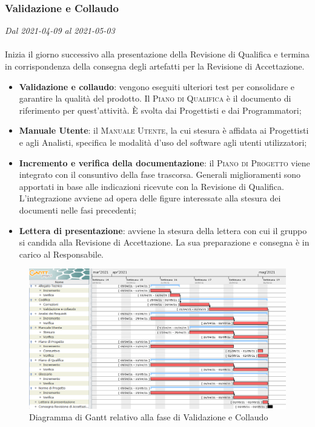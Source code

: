 \subsubsection{Validazione e Collaudo}

\textit{Dal 2021-04-09 al 2021-05-03}
\\\\
Inizia il giorno successivo alla presentazione della Revisione di Qualifica e termina in corrispondenza della consegna degli artefatti per la Revisione di Accettazione.
\begin{itemize}
	\item \textbf{Validazione e collaudo}: vengono eseguiti ulteriori test per consolidare e garantire la qualità del prodotto. Il \textsc{Piano di Qualifica} è il documento di riferimento per quest'attività. \`E svolta dai Progettisti e dai Programmatori;
	\item \textbf{Manuale Utente}: il \textsc{Manuale Utente}, la cui stesura è affidata ai Progettisti e agli Analisti, specifica le modalità d'uso del software agli utenti utilizzatori;
	\item \textbf{Incremento e verifica della documentazione}: il \textsc{Piano di Progetto} viene integrato con il consuntivo della fase trascorsa. Generali miglioramenti sono apportati in base alle indicazioni ricevute con la Revisione di Qualifica. L'integrazione avviene ad opera delle figure interessate alla stesura dei documenti nelle fasi precedenti;
	\item \textbf{Lettera di presentazione}: avviene la stesura della lettera con cui il gruppo si candida alla Revisione di Accettazione. La sua preparazione e consegna è in carico al Responsabile.
\end{itemize}

\begin{figure}[H]
	\centering
	\includegraphics[scale=0.51]{res/images/06_gantt_validazione}
	\caption{Diagramma di Gantt relativo alla fase di Validazione e Collaudo}
\end{figure}